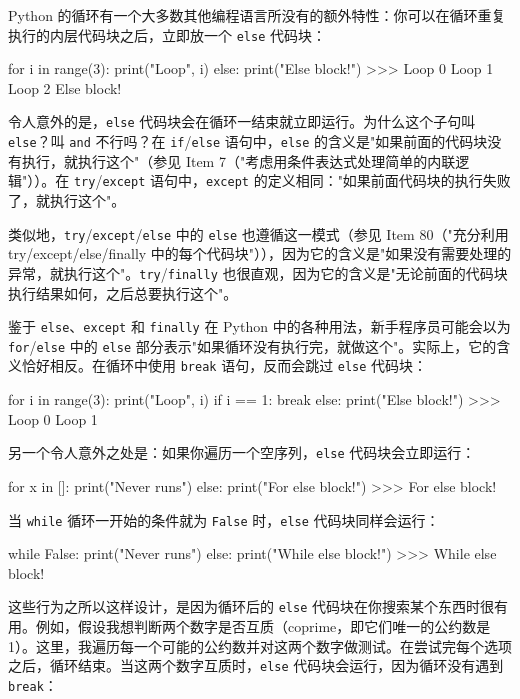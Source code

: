 Python 的循环有一个大多数其他编程语言所没有的额外特性：你可以在循环重复执行的内层代码块之后，立即放一个 \texttt{else} 代码块：

\begin{codebox}[python]
for i in range(3):
    print("Loop", i)
else:
    print("Else block!")
>>>
Loop 0
Loop 1
Loop 2
Else block!
\end{codebox}

令人意外的是，\texttt{else} 代码块会在循环一结束就立即运行。为什么这个子句叫 \texttt{else}？叫 \texttt{and} 不行吗？在 \texttt{if}/\texttt{else} 语句中，\texttt{else} 的含义是"如果前面的代码块没有执行，就执行这个"（参见 Item 7（"考虑用条件表达式处理简单的内联逻辑"））。在 \texttt{try}/\texttt{except} 语句中，\texttt{except} 的定义相同："如果前面代码块的执行失败了，就执行这个"。

类似地，\texttt{try}/\texttt{except}/\texttt{else} 中的 \texttt{else} 也遵循这一模式（参见 Item 80（"充分利用 try/except/else/finally 中的每个代码块"）），因为它的含义是"如果没有需要处理的异常，就执行这个"。\texttt{try}/\texttt{finally} 也很直观，因为它的含义是"无论前面的代码块执行结果如何，之后总要执行这个"。

鉴于 \texttt{else}、\texttt{except} 和 \texttt{finally} 在 Python 中的各种用法，新手程序员可能会以为 \texttt{for}/\texttt{else} 中的 \texttt{else} 部分表示"如果循环没有执行完，就做这个"。实际上，它的含义恰好相反。在循环中使用 \texttt{break} 语句，反而会跳过 \texttt{else} 代码块：

\begin{codebox}[python]
for i in range(3):
    print("Loop", i)
    if i == 1:
        break
else:
    print("Else block!")
>>>
Loop 0
Loop 1
\end{codebox}

另一个令人意外之处是：如果你遍历一个空序列，\texttt{else} 代码块会立即运行：

\begin{codebox}[python]
for x in []:
    print("Never runs")
else:
    print("For else block!")
>>>
For else block!
\end{codebox}

当 \texttt{while} 循环一开始的条件就为 \texttt{False} 时，\texttt{else} 代码块同样会运行：

\begin{codebox}[python]
while False:
    print("Never runs")
else:
    print("While else block!")
>>>
While else block!
\end{codebox}

这些行为之所以这样设计，是因为循环后的 \texttt{else} 代码块在你搜索某个东西时很有用。例如，假设我想判断两个数字是否互质（coprime，即它们唯一的公约数是 1）。这里，我遍历每一个可能的公约数并对这两个数字做测试。在尝试完每个选项之后，循环结束。当这两个数字互质时，\texttt{else} 代码块会运行，因为循环没有遇到 \texttt{break}：

